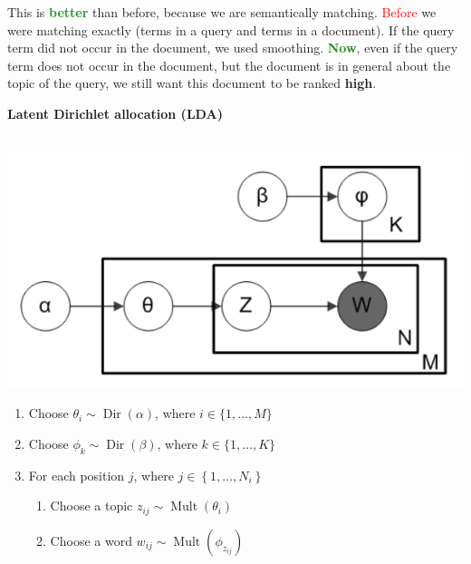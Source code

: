 \begin{enumerate}
    This is \textbf{\textcolor{ForestGreen}{better}} than before, because we are semantically matching. \textcolor{Red}{Before} we were matching exactly (terms in a query and terms in a document). If the query term did not occur in the document, we used smoothing. \textbf{\textcolor{ForestGreen}{Now}}, even if the query term does not occur in the document, but the document is in general about the topic of the query, we still want this document to be ranked \textbf{high}.
    
    \textbf{\textcolor{OliveGreen}{Latent Dirichlet allocation (LDA)}} \\
    \\
    \begin{minipage}{0.4\textwidth}
        \;\;\; \includegraphics[scale=0.5]{figures/LDA.png}
    \end{minipage}
    \begin{minipage}{0.6\textwidth}
    \begin{enumerate}
        \item Choose $\theta_{i} \sim \operatorname{Dir}(\alpha)$, where $i \in\{1, \ldots, M\}$
        \item Choose $\phi_{k} \sim \operatorname{Dir}(\beta)$, where $k \in\{1, \ldots, K\}$
        \item For each position $j$, where $j \in\left\{1, \ldots, N_{i}\right\}$
        \begin{enumerate}
            \item Choose a topic $z_{i j} \sim \operatorname{Mult}\left(\theta_{i}\right)$
            \item Choose a word $w_{i j} \sim \operatorname{Mult}\left(\phi_{z_{i j}}\right)$
        \end{enumerate}
    \end{enumerate}
    \end{minipage}
    \\

\end{enumerate}
